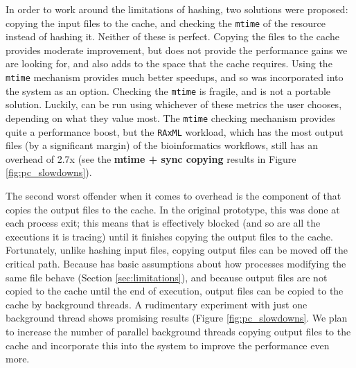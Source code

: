 In order to work around the limitations of hashing, two solutions were proposed: copying the input files to the cache, and checking the \texttt{mtime} of the resource instead of hashing it. Neither of these is perfect. Copying the files to the cache provides moderate improvement, but does not provide the performance gains we are looking for, and also adds to the space that the cache requires. Using the \texttt{mtime} mechanism provides much better speedups, and so was incorporated into the system as an option. Checking the \texttt{mtime} is fragile, and is not a portable solution. Luckily, \pc can be run using whichever of these metrics the user chooses, depending on what they value most. The \texttt{mtime} checking mechanism provides quite a performance boost, but the \texttt{RAxML} workload, which has the most output files (by a significant margin) of the bioinformatics workflows, still has an overhead of 2.7x (see the \textbf{mtime + sync copying} results in Figure \ref{fig:pc_slowdowns}).

The second worst offender when it comes to overhead is the component of \pc that copies the output files to the cache. In the original \pc prototype, this was done at each process exit; this means that \pc is effectively blocked (and so are all the executions it is tracing) until it finishes copying the output files to the cache. Fortunately, unlike hashing input files, copying output files can be moved off the critical path. Because \pc has basic assumptions about how processes modifying the same file behave (Section \ref{sec:limitations}), and because output files are not copied to the cache until the end of execution, output files can be copied to the cache by background threads. A rudimentary experiment with just one background thread shows promising results (Figure \ref{fig:pc_slowdowns}. We plan to increase the number of parallel background threads copying output files to the cache and incorporate this into the system to improve the performance even more.



